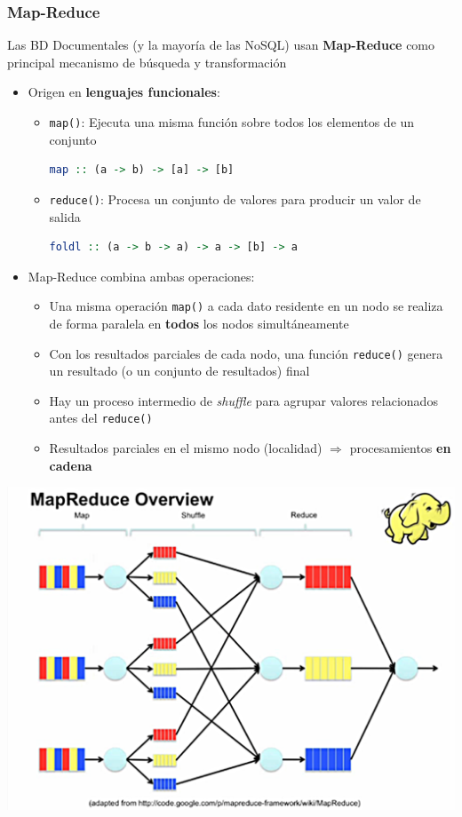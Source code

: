 \documentclass[14pt]{beamer}
\begin{document}
\begin{frame}
\frametitle{Map-Reduce}

\begin{block}{}
  \centering Las BD Documentales (y la mayoría de las NoSQL) usan {\bf
    Map-Reduce} como principal mecanismo de búsqueda y transformación
\end{block}

\begin{itemize}
\item Origen en {\bf lenguajes funcionales}:
\begin{itemize}
\item {\tt map()}: Ejecuta una misma función sobre todos los elementos de
  un conjunto
\begin{lstlisting}[language=haskell]
map :: (a -> b) -> [a] -> [b]
\end{lstlisting}
\item {\tt reduce()}: Procesa un conjunto de valores para producir un
  valor de salida
\begin{lstlisting}[language=haskell]
foldl :: (a -> b -> a) -> a -> [b] -> a
\end{lstlisting}
\end{itemize}

\framebreak

\item Map-Reduce combina ambas operaciones:
\begin{itemize}
\item Una misma operación {\tt map()} a cada dato residente en un nodo se
  realiza de forma paralela en {\bf todos} los nodos simultáneamente
\item Con los resultados parciales de cada nodo, una función {\tt reduce()}
  genera un resultado (o un conjunto de resultados) final
\item Hay un proceso intermedio de {\em shuffle} para agrupar valores
  relacionados antes del {\tt reduce()}
\item Resultados parciales en el mismo nodo (localidad) $\Rightarrow$
  procesamientos {\bf en cadena}
\end{itemize}
\end{itemize}

\framebreak

\centering\includegraphics[width=.9\textwidth]{img/mapreduce1}


\end{frame}
\end{document}
